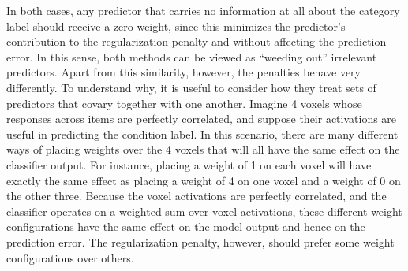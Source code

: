 In both cases, any predictor that carries no information at all about the category label should receive a zero weight, since this minimizes the predictor's contribution to the regularization penalty and without affecting the prediction error. In this sense, both methods can be viewed as ``weeding out'' irrelevant predictors. Apart from this similarity, however, the penalties behave very differently. To understand why, it is useful to consider how they treat sets of predictors that covary together with one another. Imagine 4 voxels whose responses across items are perfectly correlated, and suppose their activations are useful in predicting the condition label. In this scenario, there are many different ways of placing weights over the 4 voxels that will all have the same effect on the classifier output. For instance, placing a weight of 1 on each voxel will have exactly the same effect as placing a weight of 4 on one voxel and a weight of 0 on the other three. Because the voxel activations are perfectly correlated, and the classifier operates on a weighted sum over voxel activations, these different weight configurations have the same effect on the model output and hence on the prediction error. The regularization penalty, however, should prefer some weight configurations over others.

